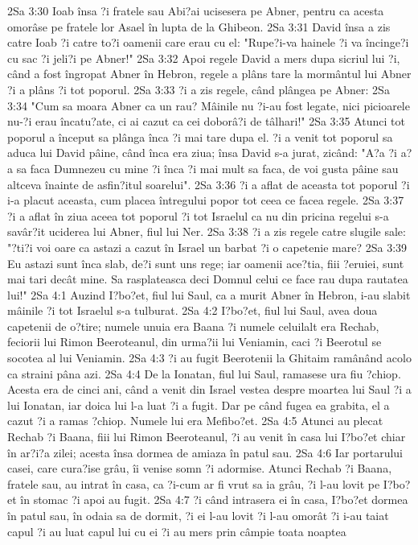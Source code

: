 2Sa 3:30  Ioab însa ?i fratele sau Abi?ai ucisesera pe Abner, pentru ca acesta omorâse pe fratele lor Asael în lupta de la Ghibeon.
2Sa 3:31  David însa a zis catre Ioab ?i catre to?i oamenii care erau cu el: "Rupe?i-va hainele ?i va încinge?i cu sac ?i jeli?i pe Abner!"
2Sa 3:32  Apoi regele David a mers dupa sicriul lui ?i, când a fost îngropat Abner în Hebron, regele a plâns tare la mormântul lui Abner ?i a plâns ?i tot poporul.
2Sa 3:33  ?i a zis regele, când plângea pe Abner:
2Sa 3:34  "Cum sa moara Abner ca un rau? Mâinile nu ?i-au fost legate, nici picioarele nu-?i erau încatu?ate, ci ai cazut ca cei doborâ?i de tâlhari!"
2Sa 3:35  Atunci tot poporul a început sa plânga înca ?i mai tare dupa el. ?i a venit tot poporul sa aduca lui David pâine, când înca era ziua; însa David s-a jurat, zicând: "A?a ?i a?a sa faca Dumnezeu cu mine ?i înca ?i mai mult sa faca, de voi gusta pâine sau altceva înainte de asfin?itul soarelui".
2Sa 3:36  ?i a aflat de aceasta tot poporul ?i i-a placut aceasta, cum placea întregului popor tot ceea ce facea regele.
2Sa 3:37  ?i a aflat în ziua aceea tot poporul ?i tot Israelul ca nu din pricina regelui s-a savâr?it uciderea lui Abner, fiul lui Ner.
2Sa 3:38  ?i a zis regele catre slugile sale: "?ti?i voi oare ca astazi a cazut în Israel un barbat ?i o capetenie mare?
2Sa 3:39  Eu astazi sunt înca slab, de?i sunt uns rege; iar oamenii ace?tia, fiii ?eruiei, sunt mai tari decât mine. Sa rasplateasca deci Domnul celui ce face rau dupa rautatea lui!"
2Sa 4:1  Auzind I?bo?et, fiul lui Saul, ca a murit Abner în Hebron, i-au slabit mâinile ?i tot Israelul s-a tulburat.
2Sa 4:2  I?bo?et, fiul lui Saul, avea doua capetenii de o?tire; numele unuia era Baana ?i numele celuilalt era Rechab, feciorii lui Rimon Beeroteanul, din urma?ii lui Veniamin, caci ?i Beerotul se socotea al lui Veniamin.
2Sa 4:3  ?i au fugit Beerotenii la Ghitaim ramânând acolo ca straini pâna azi.
2Sa 4:4  De la Ionatan, fiul lui Saul, ramasese ura fiu ?chiop. Acesta era de cinci ani, când a venit din Israel vestea despre moartea lui Saul ?i a lui Ionatan, iar doica lui l-a luat ?i a fugit. Dar pe când fugea ea grabita, el a cazut ?i a ramas ?chiop. Numele lui era Mefibo?et.
2Sa 4:5  Atunci au plecat Rechab ?i Baana, fiii lui Rimon Beeroteanul, ?i au venit în casa lui I?bo?et chiar în ar?i?a zilei; acesta însa dormea de amiaza în patul sau.
2Sa 4:6  Iar portarului casei, care cura?ise grâu, îi venise somn ?i adormise. Atunci Rechab ?i Baana, fratele sau, au intrat în casa, ca ?i-cum ar fi vrut sa ia grâu, ?i l-au lovit pe I?bo?et în stomac ?i apoi au fugit.
2Sa 4:7  ?i când intrasera ei în casa, I?bo?et dormea în patul sau, în odaia sa de dormit, ?i ei l-au lovit ?i l-au omorât ?i i-au taiat capul ?i au luat capul lui cu ei ?i au mers prin câmpie toata noaptea
